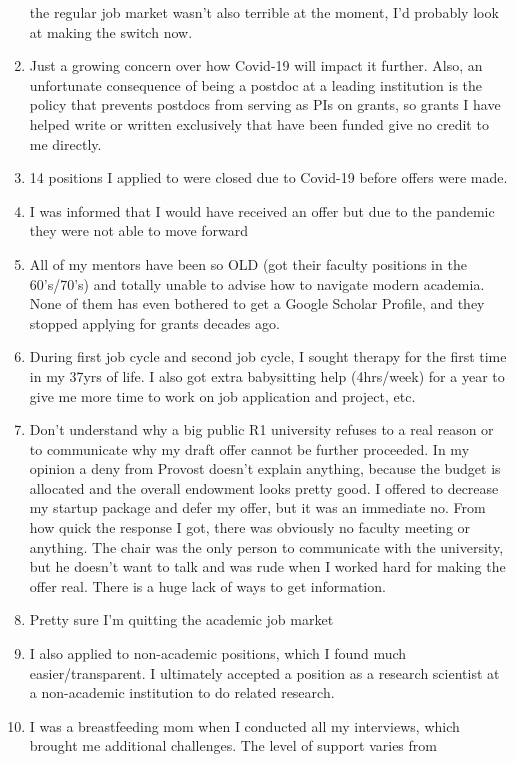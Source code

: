 \documentclass[]{article}
\begin{document}
\begin{enumerate}
  the regular job market wasn't also terrible at the moment, I'd
  probably look at making the switch now.
\item
  Just a growing concern over how Covid-19 will impact it further. Also,
  an unfortunate consequence of being a postdoc at a leading institution
  is the policy that prevents postdocs from serving as PIs on grants, so
  grants I have helped write or written exclusively that have been
  funded give no credit to me directly.
\item
  14 positions I applied to were closed due to Covid-19 before offers
  were made.
\item
  I was informed that I would have received an offer but due to the
  pandemic they were not able to move forward
\item
  All of my mentors have been so OLD (got their faculty positions in the
  60's/70's) and totally unable to advise how to navigate modern
  academia. None of them has even bothered to get a Google Scholar
  Profile, and they stopped applying for grants decades ago.
\item
  During first job cycle and second job cycle, I sought therapy for the
  first time in my 37yrs of life. I also got extra babysitting help
  (4hrs/week) for a year to give me more time to work on job application
  and project, etc.
\item
  Don't understand why a big public R1 university refuses to a real
  reason or to communicate why my draft offer cannot be further
  proceeded. In my opinion a deny from Provost doesn't explain anything,
  because the budget is allocated and the overall endowment looks pretty
  good. I offered to decrease my startup package and defer my offer, but
  it was an immediate no. From how quick the response I got, there was
  obviously no faculty meeting or anything. The chair was the only
  person to communicate with the university, but he doesn't want to talk
  and was rude when I worked hard for making the offer real. There is a
  huge lack of ways to get information.
\item
  Pretty sure I'm quitting the academic job market
\item
  I also applied to non-academic positions, which I found much
  easier/transparent. I ultimately accepted a position as a research
  scientist at a non-academic institution to do related research.
\item
  I was a breastfeeding mom when I conducted all my interviews, which
  brought me additional challenges. The level of support varies from

\end{enumerate}
\end{document}
